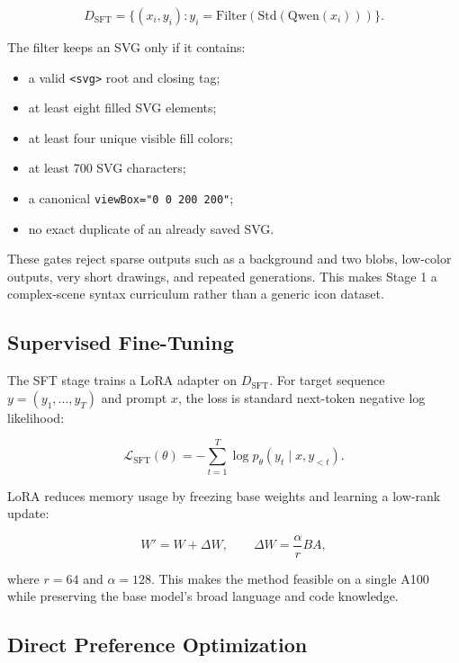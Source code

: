 \documentclass[10pt,twocolumn]{article}
\begin{document}
\begin{equation}
D_{\mathrm{SFT}} =
\{(x_i, y_i): y_i = \mathrm{Filter}(\mathrm{Std}(\mathrm{Qwen}(x_i)))\}.
\end{equation}

The filter keeps an SVG only if it contains:
\begin{itemize}
  \item a valid \texttt{<svg>} root and closing tag;
  \item at least eight filled SVG elements;
  \item at least four unique visible fill colors;
  \item at least 700 SVG characters;
  \item a canonical \texttt{viewBox="0 0 200 200"};
  \item no exact duplicate of an already saved SVG.
\end{itemize}

These gates reject sparse outputs such as a background and two blobs, low-color
outputs, very short drawings, and repeated generations. This makes Stage 1 a
complex-scene syntax curriculum rather than a generic icon dataset.

\subsection{Supervised Fine-Tuning}

The SFT stage trains a LoRA adapter on \(D_{\mathrm{SFT}}\). For target sequence
\(y=(y_1,\ldots,y_T)\) and prompt \(x\), the loss is standard next-token
negative log likelihood:

\begin{equation}
\mathcal{L}_{\mathrm{SFT}}(\theta)
= -\sum_{t=1}^{T} \log p_{\theta}(y_t \mid x,y_{<t}).
\end{equation}

LoRA reduces memory usage by freezing base weights and learning a low-rank
update:

\begin{equation}
W' = W + \Delta W,\qquad
\Delta W = \frac{\alpha}{r}BA,
\end{equation}

where \(r=64\) and \(\alpha=128\). This makes the method feasible on a single
A100 while preserving the base model's broad language and code knowledge.

\subsection{Direct Preference Optimization}
\end{document}
